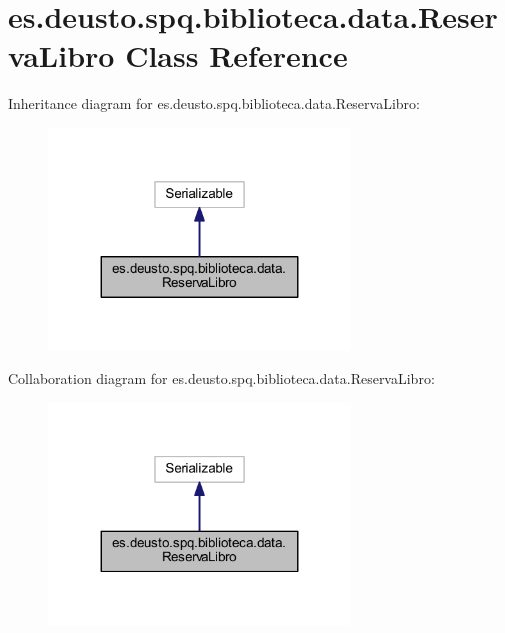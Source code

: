 \hypertarget{classes_1_1deusto_1_1spq_1_1biblioteca_1_1data_1_1_reserva_libro}{}\section{es.\+deusto.\+spq.\+biblioteca.\+data.\+Reserva\+Libro Class Reference}
\label{classes_1_1deusto_1_1spq_1_1biblioteca_1_1data_1_1_reserva_libro}


Inheritance diagram for es.\+deusto.\+spq.\+biblioteca.\+data.\+Reserva\+Libro\+:
\nopagebreak
\begin{figure}[H]
\begin{center}
\leavevmode
\includegraphics[width=227pt]{classes_1_1deusto_1_1spq_1_1biblioteca_1_1data_1_1_reserva_libro__inherit__graph}
\end{center}
\end{figure}


Collaboration diagram for es.\+deusto.\+spq.\+biblioteca.\+data.\+Reserva\+Libro\+:
\nopagebreak
\begin{figure}[H]
\begin{center}
\leavevmode
\includegraphics[width=227pt]{classes_1_1deusto_1_1spq_1_1biblioteca_1_1data_1_1_reserva_libro__coll__graph}
\end{center}
\end{figure}
